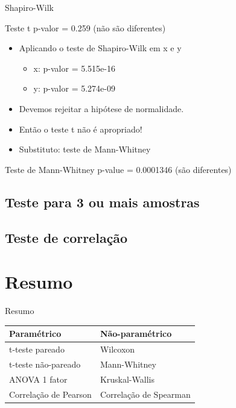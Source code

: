 \documentclass{beamer}
\begin{document}
\begin{frame}{Shapiro-Wilk}
  \begin{block}{Teste t}
    p-valor = 0.259 (não são diferentes)
  \end{block}
  \begin{itemize}
  \item<2-> Aplicando o teste de Shapiro-Wilk em x e y
    \begin{itemize}
    \item<2-> x: p-valor = 5.515e-16
    \item<2-> y: p-valor = 5.274e-09
    \end{itemize}
  \item Devemos rejeitar a hipótese de normalidade.
  \item Então o teste t \alert{não é} apropriado!
  \item Substituto: teste de Mann-Whitney
  \end{itemize}
  \begin{block}{Teste de Mann-Whitney}
    p-value = \alert{0.0001346} (são diferentes)
  \end{block}
\end{frame}

\subsection[3+ amostras]{Teste para 3 ou mais amostras}

\subsection[Correlação]{Teste de correlação}

\section{Resumo}

\begin{frame}{Resumo}
  \begin{tabular}{||l||l||}
    \hline
    Paramétrico & Não-paramétrico\\
    \hline
    \hline
    t-teste pareado & Wilcoxon\\
    \hline
    t-teste não-pareado & Mann-Whitney\\
    \hline
    ANOVA 1 fator & Kruskal-Wallis\\
    \hline
    Correlação de Pearson & Correlação de Spearman\\
    \hline
  \end{tabular}

\end{frame}
\end{document}
